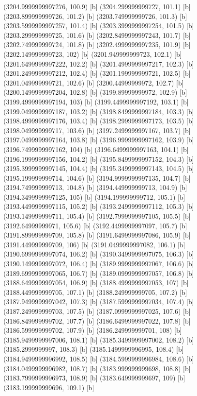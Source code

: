 {{{(3204.9999999997276, 100.9) [b] 
(3204.299999999727, 101.1) [b] 
(3203.899999999726, 101.2) [b] 
(3203.749999999726, 101.3) [b] 
(3203.5999999997257, 101.4) [b] 
(3203.3999999997254, 101.5) [b] 
(3203.299999999725, 101.6) [b] 
(3202.8499999997243, 101.7) [b] 
(3202.749999999724, 101.8) [b] 
(3202.4999999997235, 101.9) [b] 
(3202.149999999723, 102) [b] 
(3201.949999999723, 102.1) [b] 
(3201.6499999997222, 102.2) [b] 
(3201.4999999997217, 102.3) [b] 
(3201.2499999997212, 102.4) [b] 
(3201.199999999721, 102.5) [b] 
(3201.049999999721, 102.6) [b] 
(3200.44999999972, 102.7) [b] 
(3200.1499999997204, 102.8) [b] 
(3199.89999999972, 102.9) [b] 
(3199.4999999997194, 103) [b] 
(3199.4499999997192, 103.1) [b] 
(3199.0499999997187, 103.2) [b] 
(3198.8499999997184, 103.3) [b] 
(3198.4999999997176, 103.4) [b] 
(3198.2999999997173, 103.5) [b] 
(3198.049999999717, 103.6) [b] 
(3197.2499999997167, 103.7) [b] 
(3197.0499999997164, 103.8) [b] 
(3196.9999999997162, 103.9) [b] 
(3196.7499999997162, 104) [b] 
(3196.6499999997163, 104.1) [b] 
(3196.1999999997156, 104.2) [b] 
(3195.8499999997152, 104.3) [b] 
(3195.3999999997145, 104.4) [b] 
(3195.3499999997143, 104.5) [b] 
(3195.199999999714, 104.6) [b] 
(3194.9999999997135, 104.7) [b] 
(3194.749999999713, 104.8) [b] 
(3194.449999999713, 104.9) [b] 
(3194.3499999997125, 105) [b] 
(3194.199999999712, 105.1) [b] 
(3193.4499999997115, 105.2) [b] 
(3193.2499999997112, 105.3) [b] 
(3193.149999999711, 105.4) [b] 
(3192.7999999997105, 105.5) [b] 
(3192.64999999971, 105.6) [b] 
(3192.4499999997097, 105.7) [b] 
(3191.899999999709, 105.8) [b] 
(3191.6499999997086, 105.9) [b] 
(3191.449999999709, 106) [b] 
(3191.0499999997082, 106.1) [b] 
(3190.6999999997074, 106.2) [b] 
(3190.3499999997075, 106.3) [b] 
(3190.1499999997072, 106.4) [b] 
(3189.9999999997067, 106.6) [b] 
(3189.6999999997065, 106.7) [b] 
(3189.0999999997057, 106.8) [b] 
(3188.6499999997054, 106.9) [b] 
(3188.4999999997053, 107) [b] 
(3188.449999999705, 107.1) [b] 
(3188.249999999705, 107.2) [b] 
(3187.9499999997042, 107.3) [b] 
(3187.5999999997034, 107.4) [b] 
(3187.249999999703, 107.5) [b] 
(3187.0999999997025, 107.6) [b] 
(3186.849999999702, 107.7) [b] 
(3186.6499999997022, 107.8) [b] 
(3186.599999999702, 107.9) [b] 
(3186.249999999701, 108) [b] 
(3185.9499999997006, 108.1) [b] 
(3185.3499999997002, 108.2) [b] 
(3185.2999999997, 108.3) [b] 
(3185.1499999996995, 108.4) [b] 
(3184.9499999996992, 108.5) [b] 
(3184.5999999996984, 108.6) [b] 
(3184.0499999996982, 108.7) [b] 
(3183.999999999698, 108.8) [b] 
(3183.7999999996973, 108.9) [b] 
(3183.649999999697, 109) [b] 
(3183.199999999696, 109.1) [b] 
}}}
